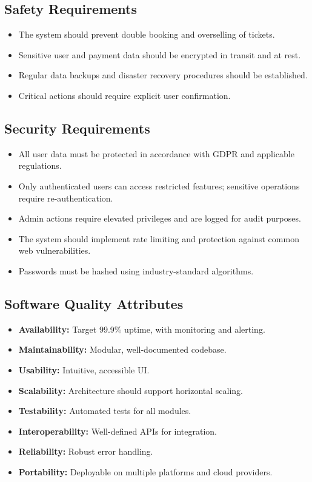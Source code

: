 \documentclass[11pt,a4paper]{article}
\begin{document}
\subsection{Safety Requirements}
\begin{itemize}
    \item The system should prevent double booking and overselling of tickets.
    \item Sensitive user and payment data should be encrypted in transit and at rest.
    \item Regular data backups and disaster recovery procedures should be established.
    \item Critical actions should require explicit user confirmation.
\end{itemize}

\subsection{Security Requirements}
\begin{itemize}
    \item All user data must be protected in accordance with GDPR and applicable regulations.
    \item Only authenticated users can access restricted features; sensitive operations require re-authentication.
    \item Admin actions require elevated privileges and are logged for audit purposes.
    \item The system should implement rate limiting and protection against common web vulnerabilities.
    \item Passwords must be hashed using industry-standard algorithms.
\end{itemize}

\subsection{Software Quality Attributes}
\begin{itemize}
    \item \textbf{Availability:} Target 99.9\% uptime, with monitoring and alerting.
    \item \textbf{Maintainability:} Modular, well-documented codebase.
    \item \textbf{Usability:} Intuitive, accessible UI.
    \item \textbf{Scalability:} Architecture should support horizontal scaling.
    \item \textbf{Testability:} Automated tests for all modules.
    \item \textbf{Interoperability:} Well-defined APIs for integration.
    \item \textbf{Reliability:} Robust error handling.
    \item \textbf{Portability:} Deployable on multiple platforms and cloud providers.
\end{itemize}
\end{document}
